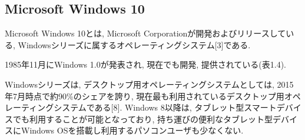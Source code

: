 \subsection{Microsoft Windows 10}
Microsoft Windows 10とは, Microsoft Corporationが開発およびリリースしている, Windowsシリーズに属するオペレーティングシステム[3]である.

1985年11月にWindows 1.0が発表され, 現在でも開発, 提供されている(表1.4).

Windowsシリーズは, デスクトップ用オペレーティングシステムとしては, 2015年7月時点で約90\%のシェアを誇り, 現在最も利用されているデスクトップ用オペレーティングシステムである[8].
Windows 8以降は, タブレット型スマートデバイスでも利用することが可能となっており, 持ち運びの便利なタブレット型デバイスにWindows OSを搭載し利用するパソコンユーザも少なくない.

